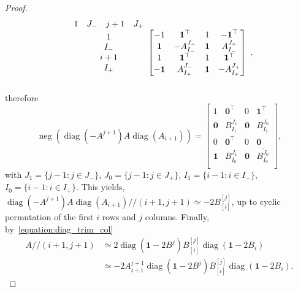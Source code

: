 \documentclass[11pt,a4paper]{amsart}
\theoremstyle{plain}
\theoremstyle{definition}
\DeclareMathOperator{\supp}{supp}
\newcommand{\trim}{/\!\!/}
\DeclareMathOperator{\diag}{diag}
\DeclareMathOperator{\nega}{neg}
\begin{document}
\begin{proof}
$$\begin{array}{c@{}c}
\begin{array}{cccc}
	1 & J_-& j+1 & J_+
\end{array}\\
\begin{array}{c}
	1\\I_- \\ i+1 \\ I_+
\end{array} &\begin{bmatrix}
	-1 & \mathbf{1}^\top & 1 & \mathbf{-1}^\top \\
	\mathbf{1} & -A_{I_-}^{J_-} & \mathbf{1} & A_{I_-}^{J_+}\\
	1& \mathbf{1}^\top &1&\mathbf{1}^\top\\ 
	\mathbf{-1}& A_{I_+}^{J_-} & \mathbf{1} & -A_{I_+}^{J_+}
\end{bmatrix}\\&\end{array},$$
therefore 
$$\nega (\diag(-A^{j+1})A\diag(A_{i+1})) =\begin{bmatrix}
1 &\mathbf{0}^\top & 0& \mathbf{1}^\top\\
\mathbf{0} & \overline{B_{I_1}^{J_1}} &\mathbf{0}& {B_{I_1}^{J_0}} \\
0 & \mathbf{0}^\top & 0 &\mathbf{0}\\
\mathbf{1} & {B_{I_0}^{J_1}} &\mathbf{0}& \overline{B_{I_0}^{J_0}} \\
\end{bmatrix},$$
with $J_1 = \{j-1\colon j\in J_-\}$, $J_0 = \{j-1\colon j\in J_+\}$, $I_1 = \{i-1\colon i\in I_-\}$, $I_0 = \{i-1\colon i\in I_+\}$.
This yields, $\diag(-A^{j+1})A\diag(A_{i+1})\trim(i+1,j+1) \simeq -2 B_{[i]}^{[j]}$, up to cyclic permutation of the first $i$ rows and $j$ columns.
Finally, by~\eqref{equation:diag_trim_col} \begin{align*}
A\trim(i+1,j+1) &\simeq 2 \diag(\mathbf{1} -2 B^j) B_{[i]}^{[j]}\diag(\mathbf{1}-2 B_i)\\
& \simeq -2 A_{i+1}^{j+1} \diag(\mathbf{1} -2 B^j) B_{[i]}^{[j]}\diag(\mathbf{1}-2 B_i).
\end{align*}







\end{proof}
\end{document}

